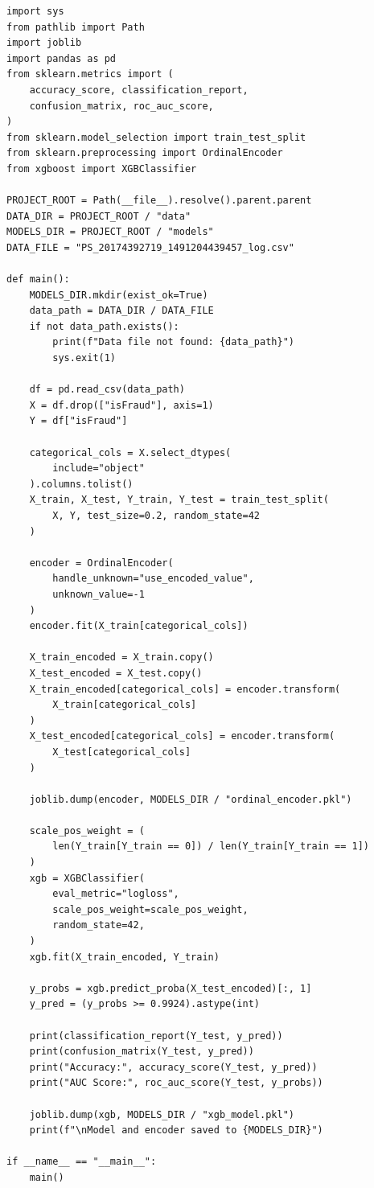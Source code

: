 \documentclass[12pt,a4paper]{report}
\begin{document}
\begin{lstlisting}[caption={Complete training pipeline — \texttt{train.py}}]
import sys
from pathlib import Path
import joblib
import pandas as pd
from sklearn.metrics import (
    accuracy_score, classification_report,
    confusion_matrix, roc_auc_score,
)
from sklearn.model_selection import train_test_split
from sklearn.preprocessing import OrdinalEncoder
from xgboost import XGBClassifier

PROJECT_ROOT = Path(__file__).resolve().parent.parent
DATA_DIR = PROJECT_ROOT / "data"
MODELS_DIR = PROJECT_ROOT / "models"
DATA_FILE = "PS_20174392719_1491204439457_log.csv"

def main():
    MODELS_DIR.mkdir(exist_ok=True)
    data_path = DATA_DIR / DATA_FILE
    if not data_path.exists():
        print(f"Data file not found: {data_path}")
        sys.exit(1)

    df = pd.read_csv(data_path)
    X = df.drop(["isFraud"], axis=1)
    Y = df["isFraud"]

    categorical_cols = X.select_dtypes(
        include="object"
    ).columns.tolist()
    X_train, X_test, Y_train, Y_test = train_test_split(
        X, Y, test_size=0.2, random_state=42
    )

    encoder = OrdinalEncoder(
        handle_unknown="use_encoded_value",
        unknown_value=-1
    )
    encoder.fit(X_train[categorical_cols])

    X_train_encoded = X_train.copy()
    X_test_encoded = X_test.copy()
    X_train_encoded[categorical_cols] = encoder.transform(
        X_train[categorical_cols]
    )
    X_test_encoded[categorical_cols] = encoder.transform(
        X_test[categorical_cols]
    )

    joblib.dump(encoder, MODELS_DIR / "ordinal_encoder.pkl")

    scale_pos_weight = (
        len(Y_train[Y_train == 0]) / len(Y_train[Y_train == 1])
    )
    xgb = XGBClassifier(
        eval_metric="logloss",
        scale_pos_weight=scale_pos_weight,
        random_state=42,
    )
    xgb.fit(X_train_encoded, Y_train)

    y_probs = xgb.predict_proba(X_test_encoded)[:, 1]
    y_pred = (y_probs >= 0.9924).astype(int)

    print(classification_report(Y_test, y_pred))
    print(confusion_matrix(Y_test, y_pred))
    print("Accuracy:", accuracy_score(Y_test, y_pred))
    print("AUC Score:", roc_auc_score(Y_test, y_probs))

    joblib.dump(xgb, MODELS_DIR / "xgb_model.pkl")
    print(f"\nModel and encoder saved to {MODELS_DIR}")

if __name__ == "__main__":
    main()
\end{lstlisting}
\end{document}
